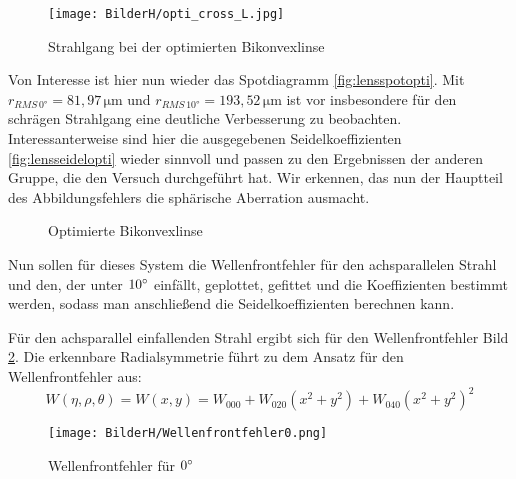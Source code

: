 \documentclass[twoside,colorback,accentcolor=tud4c,11pt]{tudreport}
\begin{document}
	\begin{figure}[H]
\centering
   	\begin{minipage}[b]{\textwidth}
   	\centering
	\label{fig:lenscrossopti}   	
   	\texttt{[image: BilderH/opti\_cross\_L.jpg]}
   	\caption{Strahlgang bei der optimierten Bikonvexlinse}
  	\end{minipage}
\end{figure}
	
	Von Interesse ist hier nun wieder das Spotdiagramm \ref{fig:lensspotopti}. Mit $r_{RMS \, 0°} = 81,97 \mathrm{\,\mu m} $ und $r_{RMS \, 10°} = 193,52 \mathrm{\,\mu m} $ ist vor insbesondere für den schrägen Strahlgang eine deutliche Verbesserung zu beobachten. Interessanterweise sind hier die ausgegebenen Seidelkoeffizienten \ref{fig:lensseidelopti} wieder sinnvoll und passen zu den Ergebnissen der anderen Gruppe, die den Versuch durchgeführt hat. Wir erkennen, das nun der Hauptteil des Abbildungsfehlers die sphärische Aberration ausmacht. 
	
	\begin{figure}[H]
\centering
  \quad
  \quad   
  \caption{Optimierte Bikonvexlinse}
\end{figure}

Nun sollen für dieses System die Wellenfrontfehler für den achsparallelen Strahl und den, der unter $10\degree$ einfällt, geplottet, gefittet und die Koeffizienten bestimmt werden, sodass man anschließend die Seidelkoeffizienten berechnen kann.

Für den achsparallel einfallenden Strahl ergibt sich für den Wellenfrontfehler Bild \ref{fig:WFF1}. Die erkennbare Radialsymmetrie führt zu dem Ansatz für den Wellenfrontfehler aus:
\[
	W(\eta,\rho,\theta)=W(x,y)=W_{000}+W_{020}\left(x^2+y^2\right)+W_{040}\left(x^2+y^2\right)^2
\]

\begin{figure}[H]
\centering
   	\begin{minipage}[b]{\textwidth}
   	\centering
	\texttt{[image: BilderH/Wellenfrontfehler0.png]}
   	\caption{Wellenfrontfehler für $0\degree$}\label{fig:WFF1} 
  	\end{minipage}  	
   	
\end{figure}
\end{document}
